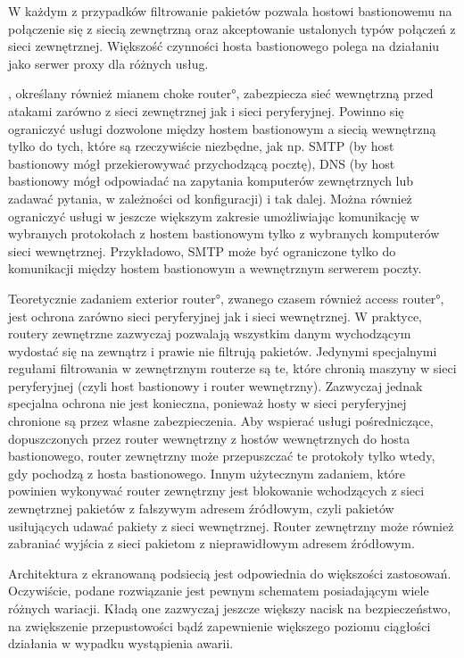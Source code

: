W każdym z przypadków filtrowanie pakietów pozwala hostowi bastionowemu na
połączenie się z siecią zewnętrzną oraz akceptowanie ustalonych typów
połączeń z sieci zewnętrznej. Większość czynności hosta bastionowego polega
na działaniu jako serwer proxy dla różnych usług.

, określany również mianem 
\ang{choke router}, zabezpiecza sieć wewnętrzną przed atakami zarówno z
sieci zewnętrznej jak i sieci peryferyjnej. Powinno się ograniczyć usługi
dozwolone między hostem bastionowym a siecią wewnętrzną tylko do tych, które
są rzeczywiście niezbędne, jak np. SMTP (by host bastionowy mógł
przekierowywać przychodzącą pocztę), DNS (by host bastionowy mógł odpowiadać
na zapytania komputerów zewnętrznych lub zadawać pytania, w zależności od
konfiguracji) i tak dalej. Można również ograniczyć usługi w jeszcze większym
zakresie umożliwiając komunikację w wybranych protokołach z hostem
bastionowym tylko z wybranych komputerów sieci wewnętrznej. Przykładowo,
SMTP może być ograniczone tylko do komunikacji między hostem bastionowym a
wewnętrznym serwerem poczty.

Teoretycznie zadaniem  \ang{exterior router},
zwanego czasem również  \ang{access router}, jest
ochrona zarówno sieci peryferyjnej jak i sieci wewnętrznej. W praktyce,
routery zewnętrzne zazwyczaj pozwalają wszystkim danym wychodzącym wydostać
się na zewnątrz i prawie nie filtrują pakietów. Jedynymi specjalnymi
regułami filtrowania w zewnętrznym routerze są te, które chronią maszyny w
sieci peryferyjnej (czyli host bastionowy i router wewnętrzny). Zazwyczaj
jednak specjalna ochrona nie jest konieczna, ponieważ hosty w sieci
peryferyjnej chronione są przez własne zabezpieczenia. Aby wspierać usługi
pośredniczące, dopuszczonych przez router wewnętrzny z hostów wewnętrznych do
hosta bastionowego, router zewnętrzny może przepuszczać te protokoły tylko
wtedy, gdy pochodzą z hosta bastionowego. Innym użytecznym zadaniem, które
powinien wykonywać router zewnętrzny jest blokowanie wchodzących z sieci
zewnętrznej pakietów z fałszywym adresem źródłowym, czyli pakietów
usiłujących udawać pakiety z sieci wewnętrznej. Router zewnętrzny może
również zabraniać wyjścia z sieci pakietom z nieprawidłowym adresem
źródłowym.

Architektura z ekranowaną podsiecią jest odpowiednia do większości
zastosowań. Oczywiście, podane rozwiązanie jest pewnym schematem
posiadającym wiele różnych wariacji. Kładą one zazwyczaj jeszcze
większy nacisk na bezpieczeństwo, na zwiększenie przepustowości bądź
zapewnienie większego poziomu ciągłości działania w wypadku wystąpienia
awarii.

